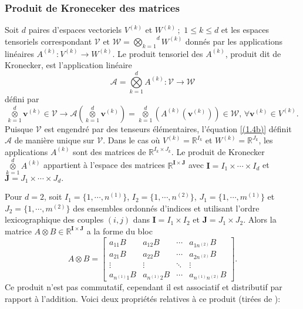 \documentclass[11pt,a4paper,oneside]{book}
\def\R{\mathbb R}
\def\A{\mathcal A}
\def\W{\mathcal W}
\def\V{\mathcal V}
\def\ktensor{\overset{d}{\underset{k=1}{\otimes}}}
\def\gktensor{\overset{d}{\underset{k=1}{\bigotimes}}}
\newcommand{\mbf}[1]{\mathbf{#1}}
\begin{document}
\subsubsection{Produit de Kroneceker des matrices}
Soit $ d $ paires d'espaces vectoriels $ V^{(k)} $ et $ W^{(k)}\,;$ $ 1\leq k\leq d $ et les espaces tensoriels correspondant
$\mathcal{V}\text{ et } \W=\gktensor W^{(k)} $ donnés par les applications linéaires $ A^{(k)}:V^{(k)}\longrightarrow W^{(k)}.$
Le produit tensoriel des $ A^{(k)} $, produit dit de Kronecker, est l'application linéaire
\begin{equation}
\A=\gktensor A^{(k)}:\mathcal{V}\longrightarrow \W
\end{equation} défini par 
\begin{equation}\label{(1.4b)}
\ktensor \mbf{v}^{(k)}\in \V\longrightarrow \A\left(\ktensor \mbf{v}^{(k)}\right)=\ktensor\left(A^{(k)}\left( \mbf{v}^{(k)}\right)\right)\in \W,\, \forall \mbf{v}^{(k)}\in V^{(k)}.
\end{equation}
Puisque $\V$ est engendré  par des tenseurs élémentaires, l'équation \eqref{(1.4b)} définit $ \A $ de manière unique sur $ \V. $ Dans le cas où $ V^{(k)}=\R^{I_{k}} $ et $ W^{(k)}=\R^{J_{k}} $, les applications $ A^{(k)} $ sont des matrices de $\R^{I_{k}\times J_{k}}  $. Le produit de Kronecker $ \ktensor A^{(k)} $ appartient à l'espace des matrices $ \R^{\mathbf{I}\times \mathbf{J}} $ avec $ \mathbf{I}=I_{1}\times\cdots\times I_{d} $ et $ \mathbf{J}=J_{1}\times\cdots\times J_{d}.$

Pour $ d=2 $, soit $ I_{1}=\{1,\cdots,n^{(1)}\} $, $ I_{2}=\{1,\cdots,n^{(2)}\} $, $ J_{1}=\{1,\cdots,m^{(1)}\} $ et $ J_{2}=\{1,\cdots,m^{(2)}\} $ des ensembles ordonnés d'indices et utilisant l'ordre lexicographique des couples $ (i,j) $ dans $ \mathbf{I}=I_{1}\times I_{2} $ et $ \mathbf{J}=J_{1}\times J_{2} $. Alors la matrice $ A\otimes B\in \R^{\mathbf{I}\times \mathbf{J}} $ a la forme du bloc
\begin{equation}
\label{2.001}
A\otimes B=\begin{bmatrix}
a_{11}B&a_{12}B&\cdots&a_{1n^{(2)}}B\\
a_{21}B&a_{22}B&\cdots&a_{2n^{(2)}}B\\
\vdots&\vdots&\ddots&\vdots\\
a_{n^{(1)}1}B&a_{n^{(1)}2}B&\cdots&a_{n^{(1)}n^{(2)}}B
\end{bmatrix}.
\end{equation}
Ce produit n’est pas commutatif, cependant il est associatif et distributif par rapport à l’addition. Voici  deux propriétés relatives à ce produit (tirées de \cite[p. 26]{bessaoudi2019reconnaissance}):
\end{document}
